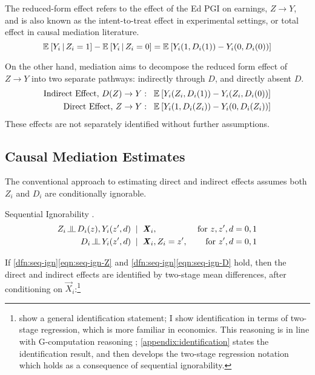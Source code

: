 The reduced-form effect refers to the effect of the Ed PGI on earnings, $Z \to Y$, and is also known as the intent-to-treat effect in experimental settings, or total effect in causal mediation literature.
\[ \mathbb{E}_{} \left[ Y_i \, \middle\vert \, Z_i = 1 \right] - \mathbb{E}_{} \left[ Y_i \, \middle\vert \, Z_i = 0 \right]
    = \mathbb{E}_{} \left[ Y_i(1, D_i(1)) - Y_i(0, D_i(0)) \right] \]

On the other hand, mediation aims to decompose the reduced form effect of $Z \to Y$ into two separate pathways: indirectly through $D$, and directly absent $D$.
\begin{align*}
    \text{Indirect Effect, } D(Z) \to Y: \;\;\;&
        \mathbb{E}_{} \left[ Y_i(Z_i, D_i(1)) - Y_i(Z_i, D_i(0)) \right] \\
    \text{Direct Effect, } Z \to Y: \;\;\;&
        \mathbb{E}_{} \left[ Y_i(1, D_i(Z_i)) - Y_i(0, D_i(Z_i)) \right]
\end{align*}
These effects are not separately identified without further assumptions.

\subsection{Causal Mediation Estimates}
The conventional approach to estimating direct and indirect effects assumes both $Z_i$ and $D_i$ are conditionally ignorable.
\begin{definition}
    \label{dfn:seq-ign}
    Sequential Ignorability \citep{imai2010identification}.
    \begin{align}
        \label{eqn:seq-ign-Z}
        Z_i \indep  D_i(z), Y_i(z', d) \;\; &| \;\; \vec X_i,
            &\textnormal{ for } z, z', d = 0, 1 \\
        \label{eqn:seq-ign-D}
        D_i \indep  Y_i(z', d) \;\; &| \;\; \vec X_i, Z_i = z', 
            &\textnormal{ for } z', d = 0, 1
    \end{align}
\end{definition}
If \ref{dfn:seq-ign}\eqref{eqn:seq-ign-Z} and \ref{dfn:seq-ign}\eqref{eqn:seq-ign-D} hold, then the direct and indirect effects are identified by two-stage mean differences, after conditioning on $\vec X_i$:\footnote{
    \cite{imai2010identification} show a general identification statement; I show identification in terms of two-stage regression, which is more familiar in economics.
    This reasoning is in line with G-computation reasoning \citep{robins1986g};
    \autoref{appendix:identification} states the \cite{imai2010identification} identification result, and then develops the two-stage regression notation which holds as a consequence of sequential ignorability.
}

